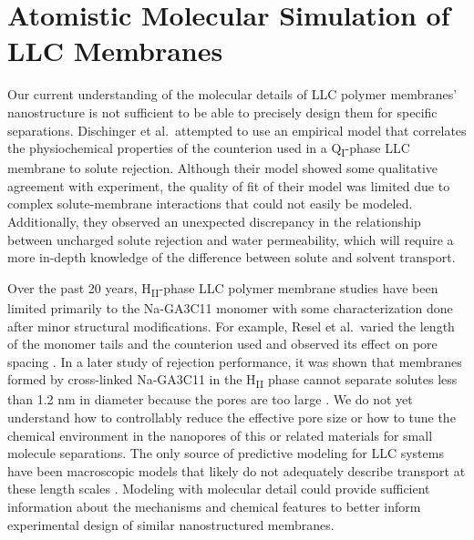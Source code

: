   \section{Atomistic Molecular Simulation of LLC Membranes}
  
  Our current understanding of the molecular details of LLC polymer membranes'
  nanostructure is not sufficient to be able to precisely design them for
  specific separations. Dischinger et al.~attempted to use an empirical model
  that correlates the physiochemical properties of the counterion used in a
  Q\textsubscript{I}-phase LLC membrane to solute rejection\cite{dischinger_effect_2017}.
  Although their model showed some qualitative agreement with experiment, the
  quality of fit of their model was limited due to complex solute-membrane
  interactions that could not easily be modeled. Additionally, they observed
  an unexpected discrepancy in the relationship between uncharged solute
  rejection and water permeability, which will require a more in-depth knowledge of
  the difference between solute and solvent transport.

  Over the past 20 years, H\textsubscript{II}-phase LLC polymer membrane
  studies have been limited primarily to the Na-GA3C11 monomer with some
  characterization done after minor structural modifications. For example, Resel
  et al.~varied the length of the monomer tails and the counterion used and
  observed its effect on pore spacing \cite{resel_structural_2000}. In a later
  study of rejection performance, it was shown that membranes formed by
  cross-linked Na-GA3C11 in the H\textsubscript{II} phase cannot separate solutes
  less than 1.2 nm in diameter because the pores are too large
  \cite{zhou_supported_2005}. We do not yet understand how to controllably reduce
  the effective pore size or how to tune the chemical environment in the
  nanopores of this or related materials for small molecule separations. The only
  source of predictive modeling for LLC systems have been macroscopic models that
  likely do not adequately describe transport at these length scales
  \cite{hatakeyama_water_2011}. Modeling with molecular detail could provide
  sufficient information about the mechanisms and chemical features to better
  inform experimental design of similar nanostructured membranes.
  
